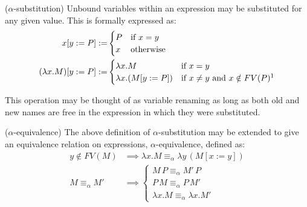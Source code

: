 \documentclass{article}
\begin{document}
        \begin{definition}{($\alpha$-substitution)}
            Unbound variables within an expression may be substituted for any given value.
            This is formally expressed as:
            \begin{align}
                x[y := P] := &
                    \begin{cases}
                        P & \text{if } x = y \\
                        x & \text{otherwise}
                    \end{cases} \\
                (\lambda x . M)[y := P] := &
                    \begin{cases}
                        \lambda x . M & \text{if } x = y \\
                        \lambda x . (M[y := P]) & \text{if } x \neq y \text{ and } x \notin FV(P) \footnotemark
                    \end{cases}
            \end{align} 
        \end{definition}
        This operation may be thought of as variable renaming as long as both old and new names are free in the expression in which they were substituted.

        \begin{corollary*}{($\alpha$-equivalence)}
            The above definition of $\alpha$-substitution may be extended to give an equivalence relation on expressions, $\alpha$-equivalence, defined as:
            \begin{align}
                y \notin FV(M) & \implies \lambda x . M \equiv_\alpha \lambda y \, (M[x := y]) \\
                M \equiv_\alpha M' & \implies
                    \begin{cases}
                        M \, P \equiv_\alpha M' \, P \\
                        P \, M \equiv_\alpha P \, M' \\
                        \lambda x . M \equiv_\alpha \lambda x. M'
                    \end{cases}
            \end{align}
        \end{corollary*}
\end{document}
